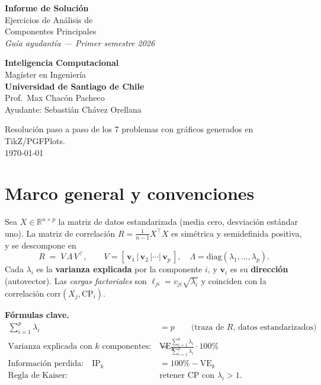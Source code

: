 \documentclass[11pt,a4paper]{article}
\begin{document}
\begin{titlepage}
\centering
\vspace*{2cm}
{\Huge\bfseries\color{usachdark} Informe de Solución\\[0.3cm]}
{\LARGE\color{usachteal} Ejercicios de Análisis de\\Componentes Principales}\\[1cm]
{\large \textit{Guía ayudantía — Primer semestre 2026}}\\[2cm]
\begin{tcolorbox}[width=0.75\textwidth,colback=usachteal!10,colframe=usachteal!70!black]
\centering
\textbf{Inteligencia Computacional}\\
Magíster en Ingeniería\\
\textbf{Universidad de Santiago de Chile}\\[0.3cm]
Prof.\ Max Chacón Pacheco\\
Ayudante: Sebastián Chávez Orellana
\end{tcolorbox}
\vspace{1.5cm}

{\small Resolución paso a paso de los 7 problemas con gráficos generados en TikZ/PGFPlots.}\\[0.3cm]
{\small\today}
\vfill
\end{titlepage}

\tableofcontents
\newpage

\section{Marco general y convenciones}

Sea $X\in\mathbb{R}^{n\times p}$ la matriz de datos estandarizada (media cero, desviación estándar uno).
La matriz de correlación $R = \tfrac{1}{n-1} X^\top X$ es simétrica y semidefinida positiva, y se descompone en
\[
R \;=\; V\,\Lambda\,V^\top, \qquad V = [\,\bm v_1\,|\,\bm v_2\,|\cdots|\,\bm v_p\,],\quad \Lambda = \mathrm{diag}(\lambda_1,\ldots,\lambda_p).
\]
Cada $\lambda_i$ es la \textbf{varianza explicada} por la componente $i$, y $\bm v_i$ es su \textbf{dirección} (autovector). Las \emph{cargas factoriales} son $\ell_{ji}=v_{ji}\sqrt{\lambda_i}$ y coinciden con la correlación $\mathrm{corr}(X_j,\mathrm{CP}_i)$.

\begin{tcolorbox}[colback=yellow!10,colframe=yellow!50!black]
\textbf{Fórmulas clave.}
\begin{align*}
\sum_{i=1}^p \lambda_i &= p \qquad\text{(traza de }R\text{, datos estandarizados)}\\[2pt]
\text{Varianza explicada con $k$ componentes:}\quad \mathrm{VE}_k &= \frac{\sum_{i=1}^k \lambda_i}{\sum_{i=1}^p \lambda_i}\cdot 100\%\\[2pt]
\text{Información perdida:}\quad \mathrm{IP}_k &= 100\% - \mathrm{VE}_k\\[2pt]
\text{Regla de Kaiser:}\quad &\text{retener CP con }\lambda_i>1.
\end{align*}
\end{tcolorbox}
\end{document}
